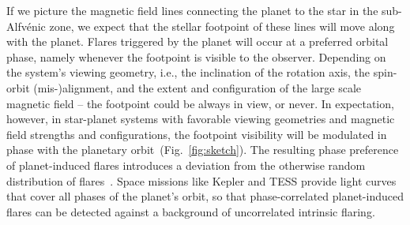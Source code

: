 \documentclass[twocolumn]{aastex631}
\begin{document}
If we picture the magnetic field lines connecting the planet to the star in the sub-Alfv\'enic zone, we expect that the stellar footpoint of these lines will move along with the planet. Flares triggered by the planet will occur at a preferred orbital phase, namely whenever the footpoint is visible to the observer. Depending on the system's viewing geometry, i.e., the inclination of the rotation axis, the spin-orbit (mis-)alignment, and the extent and configuration of the large scale magnetic field -- the footpoint could be always in view, or never. In expectation, however, in star-planet systems with favorable viewing geometries and magnetic field strengths and configurations, the footpoint visibility will be modulated in phase with the planetary orbit~(Fig.~\ref{fig:sketch}). The resulting phase preference of planet-induced flares introduces a deviation from the otherwise random distribution of flares~\citep[see, e.g.,][]{doyle2018investigating,feinstein2020flare,howard2021evryflare}. Space missions like Kepler and TESS provide light curves that cover all phases of the planet's orbit, so that phase-correlated planet-induced flares can be detected against a background of uncorrelated intrinsic flaring. 
\end{document}
